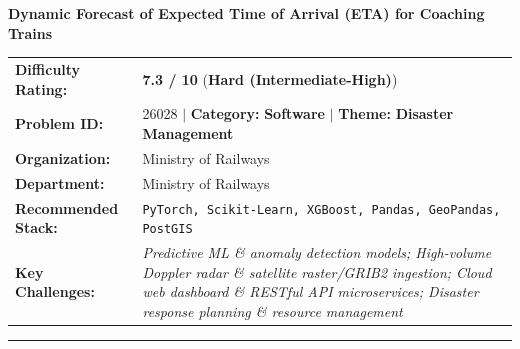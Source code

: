 \documentclass[10pt,a4paper]{article}
\begin{document}
\begin{tcolorbox}[pscard, title={"\textbf{SIH26028} \quad $\vert$ \quad Dynamic Forecast of Expected Time of Arrival (ETA) for Coaching Trains}]
\textbf{\large Dynamic Forecast of Expected Time of Arrival (ETA) for Coaching Trains}\\[0.25cm]

\begin{tabular}{@{}lp{12.5cm}@{}}
\textbf{Difficulty Rating:} & \textcolor{diffhard}{\textbf{\Large 7.3 / 10}} \quad (\textbf{Hard (Intermediate-High)}) \\
\textbf{Problem ID:} & 26028 \quad $\vert$ \quad \textbf{Category:} \textbf{Software} \quad $\vert$ \quad \textbf{Theme:} \textbf{Disaster Management} \\
\textbf{Organization:} & Ministry of Railways \\
\textbf{Department:} & Ministry of Railways \\
\textbf{Recommended Stack:} & \texttt{PyTorch, Scikit-Learn, XGBoost, Pandas, GeoPandas, PostGIS} \\
\textbf{Key Challenges:} & \textit{\small Predictive ML \& anomaly detection models; High-volume Doppler radar \& satellite raster/GRIB2 ingestion; Cloud web dashboard \& RESTful API microservices; Disaster response planning \& resource management} \\
\end{tabular}

\vspace{0.2cm}
\hrule
\vspace{0.2cm}


\end{tcolorbox}
\end{document}
